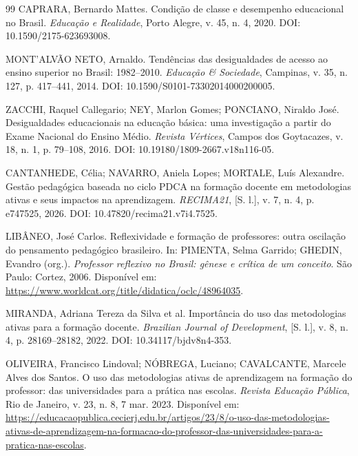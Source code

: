 \begin{thebibliography}{99}
CAPRARA, Bernardo Mattes. Condição de classe e desempenho educacional no Brasil. \textit{Educação e Realidade}, Porto Alegre, v. 45, n. 4, 2020. DOI: 10.1590/2175-623693008.

MONT'ALVÃO NETO, Arnaldo. Tendências das desigualdades de acesso ao ensino superior no Brasil: 1982--2010. \textit{Educação \& Sociedade}, Campinas, v. 35, n. 127, p. 417--441, 2014. DOI: 10.1590/S0101-73302014000200005.

ZACCHI, Raquel Callegario; NEY, Marlon Gomes; PONCIANO, Niraldo José. Desigualdades educacionais na educação básica: uma investigação a partir do Exame Nacional do Ensino Médio. \textit{Revista Vértices}, Campos dos Goytacazes, v. 18, n. 1, p. 79--108, 2016. DOI: 10.19180/1809-2667.v18n116-05.


CANTANHEDE, Célia; NAVARRO, Aniela Lopes; MORTALE, Luís Alexandre. Gestão pedagógica baseada no ciclo PDCA na formação docente em metodologias ativas e seus impactos na aprendizagem. \textit{RECIMA21}, [S. l.], v. 7, n. 4, p. e747525, 2026. DOI: 10.47820/recima21.v7i4.7525.

LIBÂNEO, José Carlos. Reflexividade e formação de professores: outra oscilação do pensamento pedagógico brasileiro. In: PIMENTA, Selma Garrido; GHEDIN, Evandro (org.). \textit{Professor reflexivo no Brasil: gênese e crítica de um conceito}. São Paulo: Cortez, 2006. Disponível em: \url{https://www.worldcat.org/title/didatica/oclc/48964035}.

MIRANDA, Adriana Tereza da Silva et al. Importância do uso das metodologias ativas para a formação docente. \textit{Brazilian Journal of Development}, [S. l.], v. 8, n. 4, p. 28169--28182, 2022. DOI: 10.34117/bjdv8n4-353.

OLIVEIRA, Francisco Lindoval; NÓBREGA, Luciano; CAVALCANTE, Marcele Alves dos Santos. O uso das metodologias ativas de aprendizagem na formação do professor: das universidades para a prática nas escolas. \textit{Revista Educação Pública}, Rio de Janeiro, v. 23, n. 8, 7 mar. 2023. Disponível em: \url{https://educacaopublica.cecierj.edu.br/artigos/23/8/o-uso-das-metodologias-ativas-de-aprendizagem-na-formacao-do-professor-das-universidades-para-a-pratica-nas-escolas}.


\end{thebibliography}
